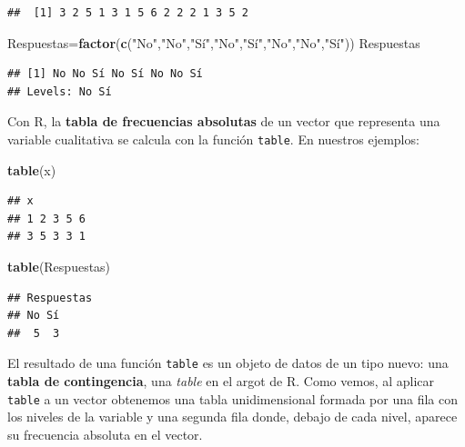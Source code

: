 \documentclass[]{book}
\newenvironment{Shaded}{\begin{snugshade}}{\end{snugshade}}
\newcommand{\KeywordTok}[1]{\textcolor[rgb]{0.13,0.29,0.53}{\textbf{#1}}}
\newcommand{\NormalTok}[1]{#1}
\newcommand{\StringTok}[1]{\textcolor[rgb]{0.31,0.60,0.02}{#1}}
\theoremstyle{definition}
\theoremstyle{definition}
\theoremstyle{definition}
\theoremstyle{remark}
\begin{document}
\begin{verbatim}
##  [1] 3 2 5 1 3 1 5 6 2 2 2 1 3 5 2
\end{verbatim}

\begin{Shaded}
\begin{Highlighting}[]
\NormalTok{Respuestas=}\KeywordTok{factor}\NormalTok{(}\KeywordTok{c}\NormalTok{(}\StringTok{"No"}\NormalTok{,}\StringTok{"No"}\NormalTok{,}\StringTok{"Sí"}\NormalTok{,}\StringTok{"No"}\NormalTok{,}\StringTok{"Sí"}\NormalTok{,}\StringTok{"No"}\NormalTok{,}\StringTok{"No"}\NormalTok{,}\StringTok{"Sí"}\NormalTok{))}
\NormalTok{Respuestas}
\end{Highlighting}
\end{Shaded}

\begin{verbatim}
## [1] No No Sí No Sí No No Sí
## Levels: No Sí
\end{verbatim}

Con R, la \textbf{tabla de frecuencias absolutas} de un vector que representa una variable cualitativa se calcula con la función \texttt{table}. En nuestros ejemplos:

\begin{Shaded}
\begin{Highlighting}[]
\KeywordTok{table}\NormalTok{(x)}
\end{Highlighting}
\end{Shaded}

\begin{verbatim}
## x
## 1 2 3 5 6 
## 3 5 3 3 1
\end{verbatim}

\begin{Shaded}
\begin{Highlighting}[]
\KeywordTok{table}\NormalTok{(Respuestas)}
\end{Highlighting}
\end{Shaded}

\begin{verbatim}
## Respuestas
## No Sí 
##  5  3
\end{verbatim}

El resultado de una función \texttt{table} es un objeto de datos de un tipo nuevo: una \textbf{tabla de contingencia}, una \emph{table} en el argot de R. Como vemos, al aplicar \texttt{table} a un vector obtenemos una tabla unidimensional formada por una fila con los niveles de la variable y una segunda fila donde, debajo de cada nivel, aparece su frecuencia absoluta en el vector.
\end{document}
